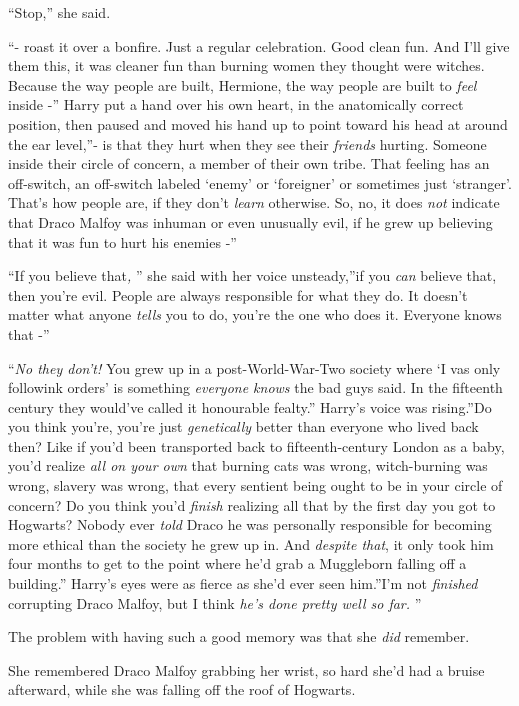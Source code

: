 ``Stop,'' she said.

``- roast it over a bonfire. Just a regular celebration. Good clean fun.
And I'll give them this, it was cleaner fun than burning women they
thought were witches. Because the way people are built, Hermione, the
way people are built to \emph{feel} inside -'' Harry put a hand over his
own heart, in the anatomically correct position, then paused and moved
his hand up to point toward his head at around the ear level,''- is that
they hurt when they see their \emph{friends} hurting. Someone inside
their circle of concern, a member of their own tribe. That feeling has
an off-switch, an off-switch labeled `enemy' or `foreigner' or sometimes
just `stranger'. That's how people are, if they don't \emph{learn}
otherwise. So, no, it does \emph{not} indicate that Draco Malfoy was
inhuman or even unusually evil, if he grew up believing that it was fun
to hurt his enemies -''

``If you believe that\emph{,} '' she said with her voice unsteady,''if you
\emph{can} believe that, then you're evil. People are always responsible
for what they do. It doesn't matter what anyone \emph{tells} you to do,
you're the one who does it. Everyone knows that -''

``\emph{No they don't!} You grew up in a post-World-War-Two society where
`I vas only followink orders' is something \emph{everyone knows} the bad
guys said. In the fifteenth century they would've called it honourable
fealty.'' Harry's voice was rising.''Do you think you're, you're just
\emph{genetically} better than everyone who lived back then? Like if
you'd been transported back to fifteenth-century London as a baby, you'd
realize \emph{all on your own} that burning cats was wrong,
witch-burning was wrong, slavery was wrong, that every sentient being
ought to be in your circle of concern? Do you think you'd \emph{finish}
realizing all that by the first day you got to Hogwarts? Nobody ever
\emph{told} Draco he was personally responsible for becoming more
ethical than the society he grew up in. And \emph{despite that}, it only
took him four months to get to the point where he'd grab a Muggleborn
falling off a building.'' Harry's eyes were as fierce as she'd ever seen
him.''I'm not \emph{finished} corrupting Draco Malfoy, but I think
\emph{he's done pretty well so far.} ''

The problem with having such a good memory was that she \emph{did}
remember.

She remembered Draco Malfoy grabbing her wrist, so hard she'd had a
bruise afterward, while she was falling off the roof of Hogwarts.

